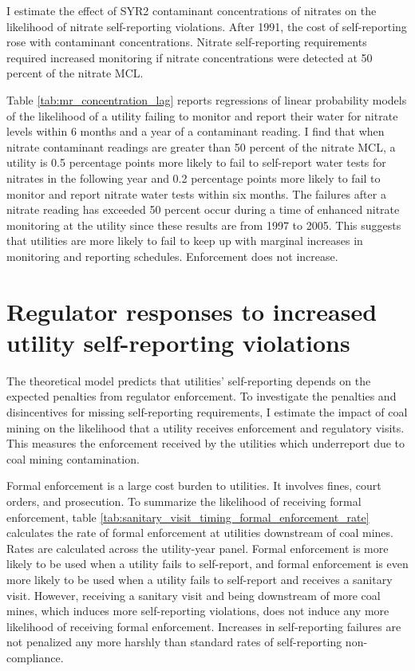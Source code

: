 \documentclass[12pt]{article}
\begin{document}
I estimate the effect of SYR2 contaminant concentrations of nitrates on the likelihood of nitrate self-reporting violations. After 1991, the cost of self-reporting rose with contaminant concentrations. Nitrate self-reporting requirements required increased monitoring if nitrate concentrations were detected at 50 percent of the nitrate MCL.

Table \ref{tab:mr_concentration_lag} reports regressions of linear probability models of the likelihood of a utility failing to monitor and report their water for nitrate levels within 6 months and a year of a contaminant reading. I find that when nitrate contaminant readings are greater than 50 percent of the nitrate MCL, a utility is 0.5 percentage points more likely to fail to self-report water tests for nitrates in the following year and 0.2 percentage points more likely to fail to monitor and report nitrate water tests within six months. The failures after a nitrate reading has exceeded 50 percent occur during a time of enhanced nitrate monitoring at the utility since these results are from 1997 to 2005. This suggests that utilities are more likely to fail to keep up with marginal increases in monitoring and reporting schedules. Enforcement does not increase. 





\section{Regulator responses to increased utility self-reporting violations}

The theoretical model predicts that utilities' self-reporting depends on the expected penalties from regulator enforcement. To investigate the penalties and disincentives for missing self-reporting requirements, I estimate the impact of coal mining on the likelihood that a utility receives enforcement and regulatory visits. This measures the enforcement received by the utilities which underreport due to coal mining contamination.



Formal enforcement is a large cost burden to utilities. It involves fines, court orders, and prosecution. To summarize the likelihood of receiving formal enforcement, table \ref{tab:sanitary_visit_timing_formal_enforcement_rate} calculates the rate of formal enforcement at utilities downstream of coal mines. Rates are calculated across the utility-year panel. Formal enforcement is more likely to be used when a utility fails to self-report, and formal enforcement is even more likely to be used when a utility fails to self-report and receives a sanitary visit. However, receiving a sanitary visit and being downstream of more coal mines, which induces more self-reporting violations, does not induce any more likelihood of receiving formal enforcement. Increases in self-reporting failures are not penalized any more harshly than standard rates of self-reporting non-compliance.
\end{document}
